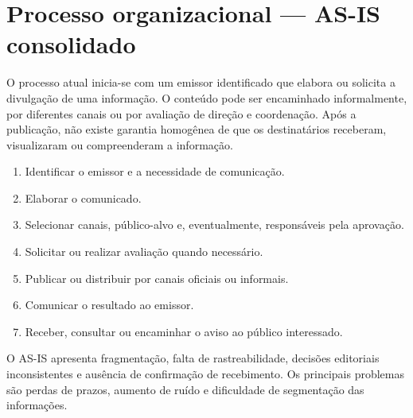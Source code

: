 \section{Processo organizacional — AS-IS consolidado}
O processo atual inicia-se com um emissor identificado que elabora ou solicita a divulgação de uma informação. O conteúdo pode ser encaminhado informalmente, por diferentes canais ou por avaliação de direção e coordenação. Após a publicação, não existe garantia homogênea de que os destinatários receberam, visualizaram ou compreenderam a informação.

\begin{enumerate}
\item Identificar o emissor e a necessidade de comunicação.
\item Elaborar o comunicado.
\item Selecionar canais, público-alvo e, eventualmente, responsáveis pela aprovação.
\item Solicitar ou realizar avaliação quando necessário.
\item Publicar ou distribuir por canais oficiais ou informais.
\item Comunicar o resultado ao emissor.
\item Receber, consultar ou encaminhar o aviso ao público interessado.
\end{enumerate}

O AS-IS apresenta fragmentação, falta de rastreabilidade, decisões editoriais inconsistentes e ausência de confirmação de recebimento. Os principais problemas são perdas de prazos, aumento de ruído e dificuldade de segmentação das informações.
